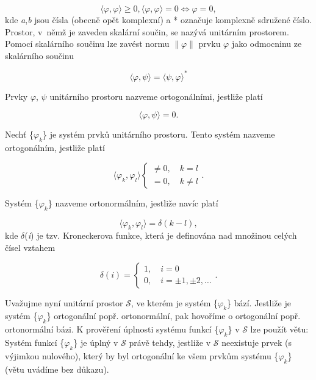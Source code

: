 \begin{equation} \label{eq:1_8}
    \langle \varphi, \varphi \rangle \geq 0, \langle \varphi, \varphi \rangle = 0 \Leftrightarrow \varphi = 0,
\end{equation}
kde \textit{a},\textit{b} jsou čísla (obecně opět komplexní) a * označuje komplexně sdružené číslo. Prostor, v~němž je zaveden skalární součin, se nazývá unitárním prostorem. Pomocí skalárního součinu lze zavést normu $\parallel \varphi \parallel$ prvku $\varphi$ jako odmocninu ze skalárního součinu

\begin{equation}
    \langle \varphi, \psi \rangle = \langle \psi, \varphi \rangle^*
\end{equation}

Prvky $\varphi$, $\psi$ unitárního prostoru nazveme ortogonálními, jestliže platí

\begin{equation} \label{eq:1_10} 
    \langle \varphi, \psi \rangle = 0.
\end{equation}

Nechť \{$\varphi_k$\} je systém prvků unitárního prostoru. Tento systém nazveme ortogonálním, jestliže platí

\begin{equation} \label{eq:1_11} 
    \langle \varphi_k, \varphi_l \rangle \left\{
    \begin{array}{l} \neq 0,
        \quad k = l \\ = 0,
        \quad k \neq l
    \end{array} \right. .
\end{equation}

Systém \{$\varphi_k$\} nazveme ortonormálním, jestliže navíc platí

\begin{equation} \label{eq:1_12}
    \langle \varphi_k, \varphi_l \rangle = \delta(k - l),
\end{equation}
kde $\delta$(\textit{i}) je tzv. Kroneckerova funkce, která je definována nad množinou celých čísel vztahem

\begin{equation} \label{eq:1_13}
    \delta(i) = \left\{
    \begin{array}{l} 1,
        \quad i = 0 \\ 0,
        \quad i = \pm 1, \pm 2, \ldots
    \end{array} \right. .
\end{equation}

Uvažujme nyní unitární prostor $\mathscr{S}$, ve kterém je systém \{$\varphi_k$\} bází. Jestliže je systém \{$\varphi_k$\} ortogonální popř. ortonormální, pak hovoříme o ortogonální popř. ortonormální bázi. K prověření úplnosti systému funkcí \{$\varphi_k$\} v $\mathscr{S}$ lze použít větu: Systém funkcí \{$\varphi_k$\} je úplný v $\mathscr{S}$ právě tehdy, jestliže v $\mathscr{S}$ neexistuje prvek (s výjimkou nulového), který by byl ortogonální ke všem prvkům systému \{$\varphi_k$\} (větu uvádíme bez důkazu).

